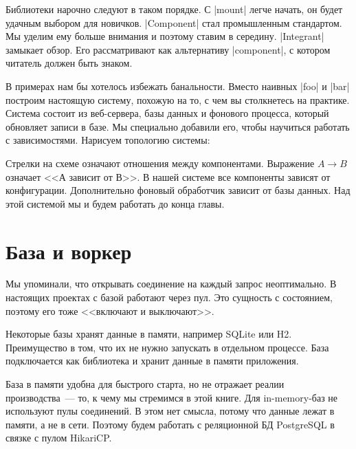 Библиотеки нарочно следуют в таком порядке. С \spverb|mount| легче начать, он
будет удачным выбором для новичков. \spverb|Component| стал промышленным
стандартом. Мы уделим ему больше внимания и поэтому ставим в
середину. \spverb|Integrant| замыкает обзор. Его рассматривают как альтернативу
\spverb|component|, с котором читатель должен быть знаком.

В примерах нам бы хотелось избежать банальности. Вместо наивных \spverb|foo| и
\spverb|bar| построим настоящую систему, похожую на то, с чем вы столкнетесь на
практике. Система состоит из веб-сервера, базы данных и фонового процесса,
который обновляет записи в базе. Мы специально добавили его, чтобы научиться
работать с зависимостями. Нарисуем топологию системы:


Стрелки на схеме означают отношения между компонентами. Выражение $A \to B$
означает <<А зависит от В>>. В нашей системе все компоненты зависят от
конфигурации. Дополнительно фоновый обработчик зависит от базы данных. Над этой
системой мы и будем работать до конца главы.

\section{База и воркер}

Мы упоминали, что открывать соединение на каждый запрос неоптимально. В
настоящих проектах с базой работают через пул. Это сущность с состоянием,
поэтому его тоже <<включают и выключают>>.

Некоторые базы хранят данные в памяти, например SQLite или H2. Преимущество в
том, что их не нужно запускать в отдельном процессе. База подключается как
библиотека и хранит данные в памяти приложения.

База в памяти удобна для быстрого старта, но не отражает реалии производства~---
то, к чему мы стремимся в этой книге. Для in-memory-баз не используют пулы
соединений. В этом нет смысла, потому что данные лежат в памяти, а не в
сети. Поэтому будем работать с реляционной БД PostgreSQL в связке с пулом
HikariCP.

